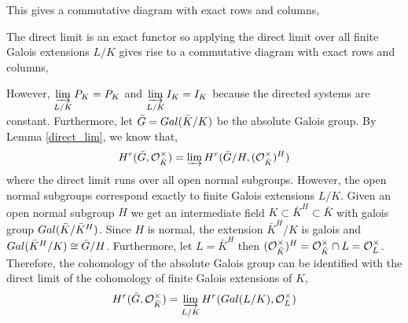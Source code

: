 \documentclass[12pt]{extarticle}
\begin{document}
This gives a commutative diagram with exact rows and columns,
\begin{center}
\end{center}
The direct limit is an exact functor so applying the direct limit over all finite Galois extensions $L/K$ gives rise to a commutative diagram with exact rows and columns,
\begin{center}
\end{center}
However, $\varinjlim\limits_{L/K} P_K = P_K$ and $\varinjlim\limits_{L/K} I_K = I_K$ because the directed systems are constant. Furthermore, let $\bar{G} = Gal \small(\bar{K}/K \small)$ be the absolute Galois group. By Lemma \ref{direct_lim}, we know that,
\[ H^r(\bar{G}, \mathcal{O}_{\bar{K}}^\times) = \varinjlim H^r(\bar{G} / H, (\mathcal{O}_{\bar{K}}^\times)^H) \]
where the direct limit runs over all open normal subgroups. However, the open normal subgroups correspond exactly to finite Galois extensions $L/K$. Given an open normal subgroup $H$ we get an intermediate field $K \subset \bar{K}^H \subset \bar{K}$ with galois group $Gal \small(\bar{K} / \bar{K}^H \small)$. Since $H$ is normal, the extension $\bar{K}^H / K$ is galois and $Gal \small(\bar{K}^H / K \small) \cong \bar{G} / H$. Furthermore, let $L = \bar{K}^H$ then $(\mathcal{O}_{\bar{K}}^\times)^H = \mathcal{O}_{\bar{K}}^\times \cap L = \mathcal{O}_{L}^\times$. Therefore, the cohomology of the absolute Galois group can be identified with the direct limit of the cohomology of finite Galois extensions of $K$,
\[ H^r(\bar{G}, \mathcal{O}_{\bar{K}}^\times) = \varinjlim_{L / K} H^r( Gal \small(L/K \small) , \mathcal{O}_{L}^\times) \]
\end{document}
